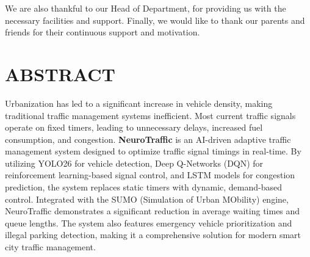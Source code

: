 \documentclass[12pt,a4paper]{report}
\begin{document}
We are also thankful to our Head of Department, for providing us with the necessary facilities and support. Finally, we would like to thank our parents and friends for their continuous support and motivation.

\chapter*{ABSTRACT}
Urbanization has led to a significant increase in vehicle density, making traditional traffic management systems inefficient. Most current traffic signals operate on fixed timers, leading to unnecessary delays, increased fuel consumption, and congestion. \textbf{NeuroTraffic} is an AI-driven adaptive traffic management system designed to optimize traffic signal timings in real-time. By utilizing YOLO26 for vehicle detection, Deep Q-Networks (DQN) for reinforcement learning-based signal control, and LSTM models for congestion prediction, the system replaces static timers with dynamic, demand-based control. Integrated with the SUMO (Simulation of Urban MObility) engine, NeuroTraffic demonstrates a significant reduction in average waiting times and queue lengths. The system also features emergency vehicle prioritization and illegal parking detection, making it a comprehensive solution for modern smart city traffic management.

\newpage
\tableofcontents
\newpage
\listoffigures
\newpage
\newpage
\listoftables
\newpage

\end{document}

